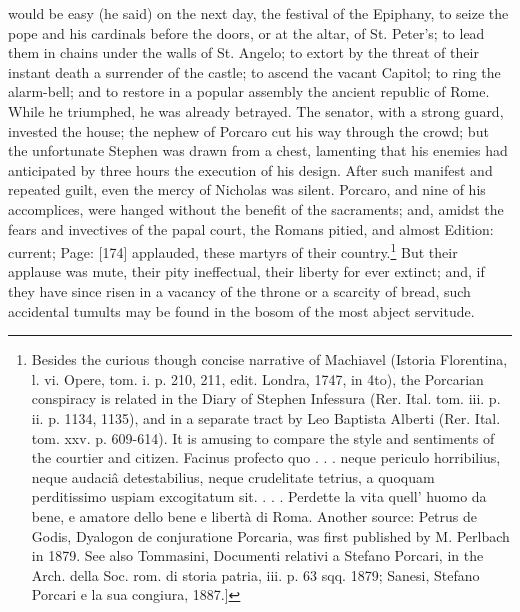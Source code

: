would be easy (he said) on the next day, the festival of the Epiphany, to seize the pope and his cardinals before the doors, or at the altar, of St. Peter\texthebrew{}’s; to lead them in chains under the walls of St. Angelo; to extort by the threat of their instant death a surrender of the castle; to ascend the vacant Capitol; to ring the alarm-bell; and to restore in a popular assembly the ancient republic of Rome. While he triumphed, he was already betrayed. The senator, with a strong guard, invested the house; the nephew of Porcaro cut his way through the crowd; but the unfortunate Stephen was drawn from a chest, lamenting that his enemies had anticipated by three hours the execution of his design. After such manifest and repeated guilt, even the mercy of Nicholas was silent. Porcaro, and nine of his accomplices, were hanged without the benefit of the sacraments; and, amidst the fears and invectives of the papal court, the Romans pitied, and almost Edition: current; Page: [174] applauded, these martyrs of their country.\footnote{Besides the curious though concise narrative of Machiavel (Istoria Florentina, l. vi. Opere, tom. i. p. 210, 211, edit. Londra, 1747, in 4to), the Porcarian conspiracy is related in the Diary of Stephen Infessura (Rer. Ital. tom. iii. p. ii. p. 1134, 1135), and in a separate tract by Leo Baptista Alberti (Rer. Ital. tom. xxv. p. 609-614). It is amusing to compare the style and sentiments of the courtier and citizen. Facinus profecto quo . . . neque periculo horribilius, neque audaciâ detestabilius, neque crudelitate tetrius, a quoquam perditissimo uspiam excogitatum sit. . . . Perdette la vita quell\texthebrew{}’ huomo da bene, e amatore dello bene e libertà di Roma. Another source: Petrus de Godis, Dyalogon de conjuratione Porcaria, was first published by M. Perlbach in 1879. See also Tommasini, Documenti relativi a Stefano Porcari, in the Arch. della Soc. rom. di storia patria, iii. p. 63 sqq. 1879; Sanesi, Stefano Porcari e la sua congiura, 1887.]} But their applause was mute, their pity ineffectual, their liberty for ever extinct; and, if they have since risen in a vacancy of the throne or a scarcity of bread, such accidental tumults may be found in the bosom of the most abject servitude.

